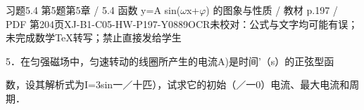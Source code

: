\begin{bankitem}{习题5.4 第5题}{第5章 / 5.4 函数 y=A sin(\ensuremath{\omega}x+\ensuremath{\varphi}) 的图象与性质 / 教材 p.197 / PDF 第204页}{XJ-B1-C05-HW-P197-Y0889}{OCR未校对：公式与文字均可能有误；未完成数学TeX转写；禁止直接发给学生}
\begin{ocrdraft}
\par
5．在匀强磁场中，匀速转动的线圈所产生的电流A)是时间'（s）的正弦型函
\par
数，设其解析式为I=3sin一／十匹），试求它的初始（／一0）电流、最大电流和周期．
\end{ocrdraft}
\end{bankitem}
